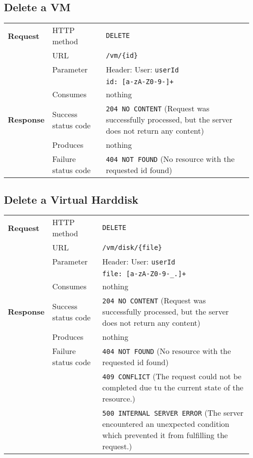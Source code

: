 \subsection{Delete a VM} %

\begin{center}
	\begin{tabularx}{\textwidth}{llX} 
	    \toprule
					\textbf{Request}        &   HTTP method             &   \texttt{DELETE}			\tabularnewline
		                        			&   URL                     &   \texttt{/vm/\{id\}}           	\tabularnewline
									& Parameter & Header: User: \texttt{userId} \tabularnewline
													& & \texttt{id: [a-zA-Z0-9-]+} \tabularnewline
                                  &   Consumes                &   nothing					      	\tabularnewline \midrule                       
          \textbf{Response}       &   Success status code     &   \texttt{204 NO CONTENT} (Request was successfully processed, but the server does not return any content) 	\tabularnewline
                                  &   Produces                &   nothing								\tabularnewline
                                  &   Failure status code     &   \texttt{404 NOT FOUND} (No resource with the requested id found)	\tabularnewline
           \bottomrule
	\end{tabularx}
\end{center}
\pagebreak[3] 	
\pagebreak[3]


\subsection{Delete a Virtual Harddisk} %

\begin{center}
	\begin{tabularx}{\textwidth}{llX} 
	    \toprule
					\textbf{Request}        &   HTTP method             &   \texttt{DELETE}			\tabularnewline
		                        			&   URL                     &   \texttt{/vm/disk/\{file\}}           	\tabularnewline
									& Parameter & Header: User: \texttt{userId} \tabularnewline
													& & \texttt{file: [a-zA-Z0-9-\_.]+} \tabularnewline
                                  &   Consumes                &   nothing					      	\tabularnewline \midrule                       
          \textbf{Response}       &   Success status code     &   \texttt{204 NO CONTENT} (Request was successfully processed, but the server does not return any content) 	\tabularnewline
                                  &   Produces                &   nothing								\tabularnewline
                                  &   Failure status code     &   \texttt{404 NOT FOUND} (No resource with the requested id found)	\tabularnewline
																																		& & \texttt{409 CONFLICT} (The request could not be completed due tu the current state of the resource.) \tabularnewline
																																		& & \texttt{500 INTERNAL SERVER ERROR} (The server encountered an unexpected condition which prevented it from fulfilling the request.) \tabularnewline
           \bottomrule
	\end{tabularx}
\end{center}
\pagebreak[3] 	
\pagebreak[3]


